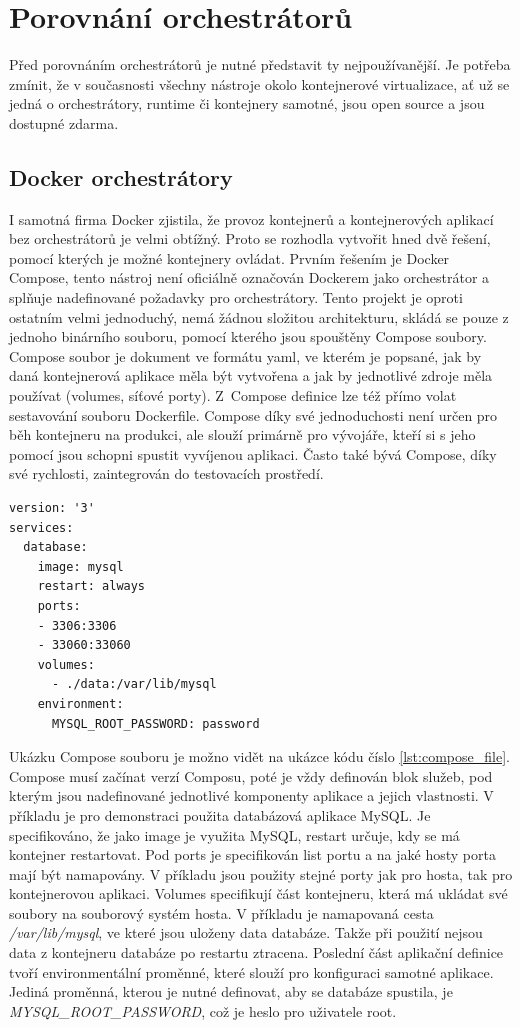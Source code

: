 \section{Porovnání orchestrátorů}
Před porovnáním orchestrátorů je nutné představit ty nejpoužívanější. Je potřeba zmínit, že v současnosti všechny nástroje okolo kontejnerové virtualizace, ať už se jedná o orchestrátory, runtime či kontejnery samotné, jsou open source a jsou dostupné zdarma.

\subsection{Docker orchestrátory}
I samotná firma Docker zjistila, že provoz kontejnerů a kontejnerových aplikací bez orchestrátorů je velmi obtížný. Proto se rozhodla vytvořit hned dvě řešení, pomocí kterých je možné kontejnery ovládat. Prvním řešením je Docker Compose, tento nástroj není oficiálně označován Dockerem jako orchestrátor a splňuje nadefinované požadavky pro orchestrátory. Tento projekt je oproti ostatním velmi jednoduchý, nemá žádnou složitou architekturu, skládá se pouze z jednoho binárního souboru, pomocí kterého jsou spouštěny Compose soubory. Compose soubor je dokument ve formátu yaml, ve kterém je popsané, jak by daná kontejnerová aplikace měla být vytvořena a jak by jednotlivé zdroje měla používat (volumes, síťové porty). Z Compose definice lze též přímo volat sestavování souboru Dockerfile. Compose díky své jednoduchosti není určen pro běh kontejneru na produkci, ale slouží primárně pro vývojáře, kteří si s jeho pomocí jsou schopni spustit vyvíjenou aplikaci. Často také bývá Compose, díky své rychlosti, zaintegrován do testovacích prostředí.

\begin{lstlisting}[caption={Docker Compose, zdroj: vlastní},label={lst:compose_file}]
version: '3'
services:
  database:
    image: mysql
    restart: always
    ports:
    - 3306:3306
    - 33060:33060
    volumes:
      - ./data:/var/lib/mysql
    environment:
      MYSQL_ROOT_PASSWORD: password
\end{lstlisting}

Ukázku Compose souboru je možno vidět na ukázce kódu číslo \ref{lst:compose_file}. Compose musí začínat verzí Composu, poté je vždy definován blok služeb, pod kterým jsou nadefinované jednotlivé komponenty aplikace a jejich vlastnosti. V příkladu je pro demonstraci použita databázová aplikace MySQL. Je specifikováno, že jako image je využita MySQL, restart určuje, kdy se má kontejner restartovat. Pod ports je specifikován list portu a na jaké hosty porta mají být namapovány. V příkladu jsou použity stejné porty jak pro hosta, tak pro kontejnerovou aplikaci. Volumes specifikují část kontejneru, která má ukládat své soubory na souborový systém hosta. V příkladu je namapovaná cesta \textit{/var/lib/mysql}, ve které jsou uloženy data databáze. Takže při použití nejsou data z kontejneru databáze po restartu ztracena. Poslední část aplikační definice tvoří environmentální proměnné, které slouží pro konfiguraci samotné aplikace. Jediná proměnná, kterou je nutné definovat, aby se databáze spustila, je \textit{MYSQL\_ROOT\_PASSWORD}, což je heslo pro uživatele root.

